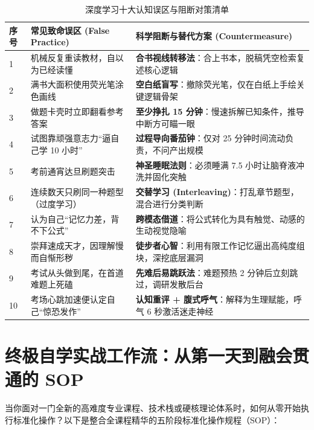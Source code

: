 \documentclass[12pt,a4paper,openany]{ctexbook}
\begin{document}
\begin{table}[H]
\centering
\small
\begin{tabular}{@{}lll@{}}
\toprule
\textbf{序号} & \textbf{常见致命误区 (False Practice)} & \textbf{科学阻断与替代方案 (Countermeasure)} \\ \midrule
1 & 机械反复重读教材，自以为已经读懂 & \textbf{合书视线转移法}：合上书本，脱稿凭空检索复述核心逻辑 \\
2 & 满书大面积使用荧光笔涂色画线 & \textbf{空白纸盲写}：撤除荧光笔，仅在白纸上手绘关键逻辑骨架 \\
3 & 做题卡壳时立即翻看参考答案 & \textbf{至少挣扎 15 分钟}：慢速拆解已知条件，推导中断方可瞄一眼 \\
4 & 试图靠顽强意志力“逼自己学 10 小时” & \textbf{过程导向番茄钟}：仅对 25 分钟时间流动负责，不问产出规模 \\
5 & 考前通宵达旦刷题突击 & \textbf{神圣睡眠法则}：必须睡满 7.5 小时让脑脊液冲洗并固化突触 \\
6 & 连续数天只刷同一种题型（过度学习） & \textbf{交替学习 (Interleaving)}：打乱章节题型，混合进行分类判断 \\
7 & 认为自己“记忆力差，背不下公式” & \textbf{跨模态借道}：将公式转化为具有触觉、动感的生动视觉隐喻 \\
8 & 崇拜速成天才，因理解慢而自惭形秽 & \textbf{徒步者心智}：利用有限工作记忆逼出高纯度组块，深挖底层漏洞 \\
9 & 考试从头做到尾，在首道难题上死磕 & \textbf{先难后易跳跃法}：难题预热 2 分钟后立刻跳过，调研发散后台 \\
10 & 考场心跳加速便认定自己“惊恐发作” & \textbf{认知重评 + 腹式呼气}：解释为生理赋能，呼气 6 秒激活迷走神经 \\ \bottomrule
\end{tabular}
\caption{深度学习十大认知误区与阻断对策清单}
\end{table}

\section{终极自学实战工作流：从第一天到融会贯通的 SOP}

当你面对一门全新的高难度专业课程、技术栈或硬核理论体系时，如何从零开始执行标准化操作？以下是整合全课程精华的五阶段标准化操作规程（SOP）：
\end{document}

